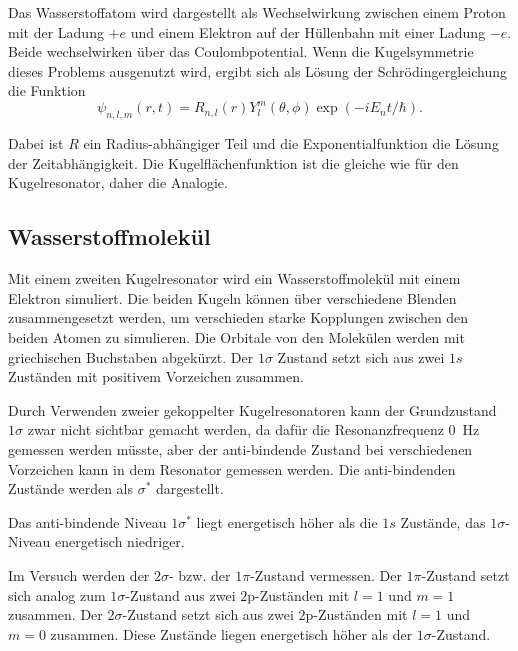 Das Wasserstoffatom wird dargestellt als Wechselwirkung zwischen einem Proton mit der Ladung $+e$ und einem Elektron auf der Hüllenbahn mit einer Ladung $-e$. Beide wechselwirken über das Coulombpotential. Wenn die Kugelsymmetrie dieses Problems ausgenutzt wird, ergibt sich als Lösung der Schrödingergleichung die Funktion 
\begin{equation*}
    \psi_{n,l,m} (r,t) = R_{n,l}(r) Y_{l}^m(\theta, \phi) \exp(-i E_n t/\hbar).
\end{equation*}

Dabei ist $R$ ein Radius-abhängiger Teil und die Exponentialfunktion die Lösung der Zeitabhängigkeit. 
Die Kugelflächenfunktion ist die gleiche wie für den Kugelresonator, daher die Analogie.

\subsection{Wasserstoffmolekül}
\label{sec:Wasserstoffmolekül}

Mit einem zweiten Kugelresonator wird ein Wasserstoffmolekül mit einem Elektron simuliert. 
Die beiden Kugeln können über verschiedene Blenden zusammengesetzt werden, um verschieden starke Kopplungen zwischen den beiden Atomen zu simulieren. 
Die Orbitale von den Molekülen werden mit griechischen Buchstaben abgekürzt. Der $1\sigma$ Zustand setzt sich aus zwei $1s$ Zuständen mit positivem Vorzeichen zusammen. \cite{QM2}

Durch Verwenden zweier gekoppelter Kugelresonatoren kann der Grundzustand $1\sigma$ zwar nicht sichtbar gemacht werden, da dafür die Resonanzfrequenz \SI{0}{\hertz} gemessen werden müsste, aber der anti-bindende Zustand bei verschiedenen Vorzeichen kann in dem Resonator gemessen werden. Die anti-bindenden Zustände werden als $\sigma^*$ dargestellt. 

Das anti-bindende Niveau $1\sigma^*$ liegt energetisch höher als die $1s$ Zustände, das $1\sigma$-Niveau energetisch niedriger. \cite{QM2}

Im Versuch werden der $2\sigma$- bzw. der $1\pi$-Zustand vermessen. Der $1\pi$-Zustand setzt sich analog zum $1\sigma$-Zustand aus zwei $\num{2}$p-Zuständen mit $l= \num{1}$ und $m= \num{1}$ zusammen. Der $2\sigma$-Zustand setzt sich aus zwei $\num{2}$p-Zuständen mit $l=\num{1}$ und $m=\num{0}$ zusammen. Diese Zustände liegen energetisch höher als der $1\sigma$-Zustand. \cite{QM2}









